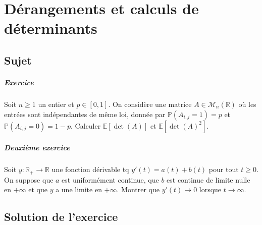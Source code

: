 \chapter{Dérangements et calculs de déterminants}

\section{Sujet}

\paragraph{Exercice}
Soit \( n \geqslant 1 \) un entier et \( p \in [0,1] \). On considère une matrice \( A \in \mathcal M_n(\mathbb R) \) où les entrées sont indépendantes de même loi, donnée par \( \mathbb P (A_{i,j} = 1) = p \) et \( \mathbb P (A_{i,j} = 0) = 1 - p \). Calculer \( \mathbb E[\det(A)] \) et \( \mathbb E[\det(A)^2] \). 

\paragraph{Deuxième exercice}
Soit \( y : \mathbb R_+ \rightarrow \mathbb R \) une fonction dérivable tq \( y'(t) = a(t) + b (t) \) pour tout \( t \geqslant 0 \). On suppose que \( a \) est uniformément continue, que \( b \) est continue de limite nulle en \( +\infty \) et que \( y \) a une limite en \( +\infty \). Montrer que \( y'(t) \rightarrow 0 \) lorsque \( t \rightarrow \infty \). 



\section{Solution de l'exercice} %

